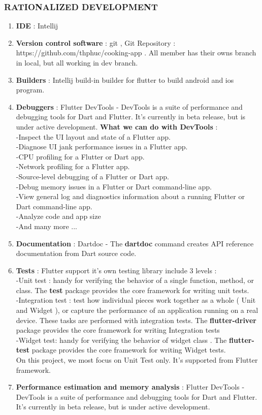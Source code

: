 \documentclass{article}
\begin{document}
\subsubsection{RATIONALIZED DEVELOPMENT}
\begin{enumerate}
\item \textbf{IDE} : Intellij 
\item \textbf{Version control software}  : git , Git Repository : https://github.com/thphuc/cooking-app  . All member has their owns branch in local, but all working in dev branch.
\item \textbf{Builders} : Intellij build-in builder for flutter to build android and ios program.
\item \textbf{Debuggers} : Flutter DevTools - DevTools is a suite of performance and debugging tools for Dart and Flutter. It’s currently in beta release, but is under active development.\textbf{ What we can do with DevTools } : \\
-Inspect the UI layout and state of a Flutter app. \\
-Diagnose UI jank performance issues in a Flutter app. \\
-CPU profiling for a Flutter or Dart app. \\
-Network profiling for a Flutter app. \\
-Source-level debugging of a Flutter or Dart app. \\
-Debug memory issues in a Flutter or Dart command-line app. \\
-View general log and diagnostics information about a running Flutter or Dart command-line app. \\
-Analyze code and app size \\
-And many more ... \\
\item \textbf{Documentation} : Dartdoc - The \textbf{dartdoc} command creates API reference documentation from Dart source code.
\item \textbf{Tests} : Flutter support it's own testing library include 3 levels :  \\
-Unit test :  handy for verifying the behavior of a single function, method, or class. The \textbf{test} package provides the core framework for writing unit tests. \\
-Integration test : test how individual pieces work together as a whole ( Unit and Widget ), or capture the performance of an application running on a real device. These tasks are performed with integration tests.  The \textbf{flutter-driver} package provides the core framework for writing Integration tests \\
 -Widget test: handy for verifying the behavior of widget class . The \textbf{flutter-test} package provides the core framework for writing Widget tests. \\
On this project, we most focus on Unit Test only. It's supported from Flutter framework.
\item \textbf{Performance estimation and memory analysis} : Flutter DevTools - DevTools is a suite of performance and debugging tools for Dart and Flutter. It’s currently in beta release, but is under active development.
\end{enumerate}
\end{document}
